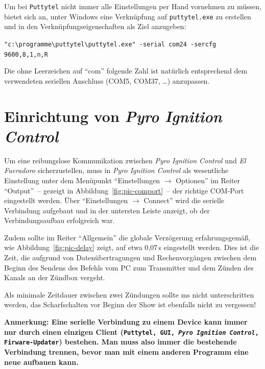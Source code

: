\documentclass[pdftex, parskip, numbers=noenddot, toc=listof]{scrbook}
\newcommand{\pic}{\emph{Pyro Ignition Control}}
\newcommand{\anlage}{\emph{El Fueradoro}}
\begin{document}
	Um bei \texttt{Puttytel} nicht immer alle Einstellungen per Hand vornehmen zu müssen, bietet sich an, unter Windows eine Verknüpfung auf \texttt{puttytel.exe} zu erstellen und in den Ver\-knüpfungs\-eigen\-schaften als Ziel anzugeben:
	\begin{center}
		\verb|"c:\programme\puttytel\puttytel.exe" -serial com24 -sercfg 9600,8,1,n,R|
	\end{center}

	Die ohne Leerzeichen auf \enquote{com} folgende Zahl ist natürlich entsprechend dem verwendeten seriellen Anschluss (COM5, COM37, \dots) anzupassen.

	\section{Einrichtung von \pic}
	\label{sec:piceinrichtung}

	Um eine reibungslose Kommunikation zwischen {\pic} und {\anlage} sicherzustellen, muss in {\pic} als wesentliche Einstellung unter dem Menüpunkt \enquote{Einstellungen $\rightarrow$ Optionen} im Reiter \enquote{Output}~-- gezeigt in Abbildung~\ref{fig:pic-comport}~-- der richtige COM-Port eingestellt werden. Über \enquote{Einstellungen $\rightarrow$ Connect} wird die serielle Verbindung aufgebaut und in der untersten Leiste anzeigt, ob der Verbindungsaufbau erfolgreich war.

	Zudem sollte im Reiter \enquote{Allgemein} die globale Verzögerung erfahrungsgemäß, wie Abbildung~\ref{fig:pic-delay} zeigt, auf etwa 0{,}07\,s eingestellt werden. Dies ist die Zeit, die aufgrund von Datenübertragungen und Rechenvorgängen zwischen dem Beginn des Sendens des Befehls vom PC zum Transmitter und dem Zünden des Kanals an der Zündbox vergeht.

	Als minimale Zeitdauer zwischen zwei Zündungen sollte \unit[100]{ms} nicht unterschritten werden, das Scharfschalten vor Beginn der Show ist ebenfalls nicht zu vergessen!

	\textbf{Anmerkung: Eine serielle Verbindung zu einem Device kann immer nur durch einen einzigen Client (\texttt{Putty\-tel, GUI, {\pic}, Firware-Updater}) bestehen. Man muss also immer die bestehende Verbindung trennen, bevor man mit einem anderen Programm eine neue aufbauen kann.}
\end{document}
